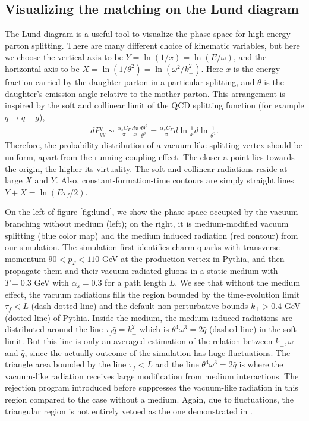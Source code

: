 \subsection{Visualizing the matching on the Lund diagram}
The Lund diagram is a useful tool to visualize the phase-space for high energy parton splitting.
There are many different choice of kinematic variables, but here we choose the vertical axis to be $Y = \ln(1/x) = \ln(E/\omega)$, and the horizontal 
axis to be $X = \ln(1/\theta^2) = \ln(\omega^2/k_\perp^2)$.
Here $x$ is the energy fraction carried by the daughter parton in a particular splitting, and $\theta$ is the daughter's emission angle relative to the mother parton.
This arrangement is inspired by the soft and collinear limit of the QCD splitting function (for example $q\rightarrow q+g$),
\begin{eqnarray}
dP^{q}_{qg} \sim \frac{\alpha_s C_F}{\pi} \frac{dx}{x}\frac{d\theta^2}{\theta^2} = \frac{\alpha_s C_F}{\pi} d\ln\frac{1}{x} d\ln\frac{1}{\theta^2}.
\end{eqnarray}
Therefore, the probability distribution of a vacuum-like splitting vertex should be uniform, apart from the running coupling effect.
The closer a point lies towards the origin, the higher its virtuality.
The soft and collinear radiations reside at large $X$ and $Y$.
Also, constant-formation-time contours are simply straight lines $Y+X=\ln(E\tau_f/2)$.

On the left of figure \ref{fig:lund}, we show the phase space occupied by the vacuum branching without medium (left); on the right, it is medium-modified vacuum splitting (blue color map) and the medium induced radiation (red contour) from our simulation.
The simulation first identifies charm quarks with transverse momentum $90 < p_T <110$ GeV at the production vertex in Pythia, and then propagate them and their vacuum radiated gluons in a static medium with $T=0.3$ GeV with $\alpha_s = 0.3$ for a path length $L$.
We see that without the medium effect, the vacuum radiations fills the region bounded by the time-evolution limit $\tau_f < L$ (dash-dotted line) and the default non-perturbative bounds $k_\perp > 0.4$ GeV (dotted line) of Pythia. 
Inside the medium, the medium-induced radiations are distributed around the line $\tau_f\hat{q} = k_\perp^2$ which is $\theta^4\omega^3 = 2\hat{q}$ (dashed line) in the soft limit.  
But this line is only an averaged estimation of the relation between $k_\perp, \omega$ and $\hat{q}$, since the actually outcome of the simulation has huge fluctuations.
The triangle area bounded by the line $\tau_f < L$ and the line $\theta^4\omega^3 = 2\hat{q}$ is where the vacuum-like radiation receives large modification from medium interactions.
The rejection program introduced before suppresses the vacuum-like radiation in this region compared to the case without a medium.
Again, due to fluctuations, the triangular region is not entirely vetoed as the one demonstrated in \cite{PhysRevLett.120.232001}.

